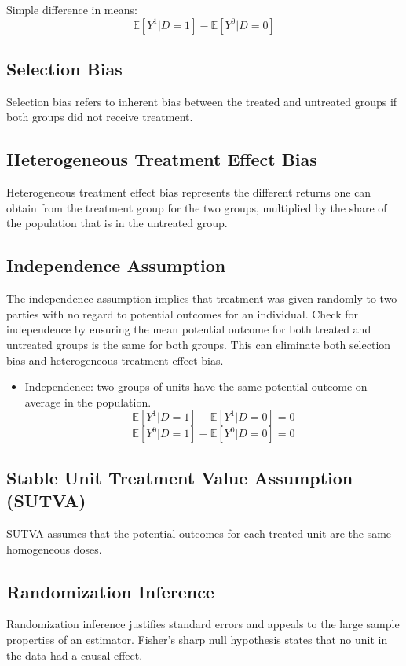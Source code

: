 \documentclass{article}
\begin{document}
Simple difference in means:
\[
\mathbb{E}[Y^1 | D = 1] - \mathbb{E}[Y^0 | D = 0]
\]

\subsection*{Selection Bias}
Selection bias refers to inherent bias between the treated and untreated groups if both groups did not receive treatment.

\subsection*{Heterogeneous Treatment Effect Bias}
Heterogeneous treatment effect bias represents the different returns one can obtain from the treatment group for the two groups, multiplied by the share of the population that is in the untreated group.

\subsection*{Independence Assumption}
The independence assumption implies that treatment was given randomly to two parties with no regard to potential outcomes for an individual. Check for independence by ensuring the mean potential outcome for both treated and untreated groups is the same for both groups. This can eliminate both selection bias and heterogeneous treatment effect bias.

\begin{itemize}
    \item Independence: two groups of units have the same potential outcome on average in the population.
    \[
    \mathbb{E}[Y^1 | D=1] - \mathbb{E}[Y^1 | D = 0] = 0
    \]
    \[
    \mathbb{E}[Y^0 | D = 1] - \mathbb{E}[Y^0 | D = 0] = 0
    \]
\end{itemize}

\subsection*{Stable Unit Treatment Value Assumption (SUTVA)}
SUTVA assumes that the potential outcomes for each treated unit are the same homogeneous doses.

\subsection*{Randomization Inference}
Randomization inference justifies standard errors and appeals to the large sample properties of an estimator. Fisher's sharp null hypothesis states that no unit in the data had a causal effect.
\end{document}
